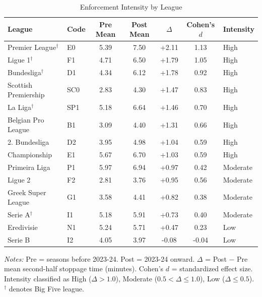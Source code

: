 \begin{table}[t]
\centering
\caption{Enforcement Intensity by League}
\label{tab:enforcement}
\small
\begin{threeparttable}
\begin{tabular}{llccccl}
\toprule
League & Code & Pre Mean & Post Mean & $\Delta$ & Cohen's $d$ & Intensity \\
\midrule
Premier League$^\dagger$ & E0 & 5.39 & 7.50 & +2.11 & 1.13 & High \\
Ligue 1$^\dagger$ & F1 & 4.71 & 6.50 & +1.79 & 1.05 & High \\
Bundesliga$^\dagger$ & D1 & 4.34 & 6.12 & +1.78 & 0.92 & High \\
Scottish Premiership & SC0 & 2.83 & 4.30 & +1.47 & 0.83 & High \\
La Liga$^\dagger$ & SP1 & 5.18 & 6.64 & +1.46 & 0.70 & High \\
Belgian Pro League & B1 & 3.09 & 4.40 & +1.31 & 0.66 & High \\
2. Bundesliga & D2 & 3.95 & 4.98 & +1.04 & 0.59 & High \\
Championship & E1 & 5.67 & 6.70 & +1.03 & 0.59 & High \\
Primeira Liga & P1 & 5.97 & 6.94 & +0.97 & 0.42 & Moderate \\
Ligue 2 & F2 & 2.81 & 3.76 & +0.95 & 0.56 & Moderate \\
Greek Super League & G1 & 3.58 & 4.41 & +0.82 & 0.38 & Moderate \\
Serie A$^\dagger$ & I1 & 5.18 & 5.91 & +0.73 & 0.40 & Moderate \\
Eredivisie & N1 & 5.24 & 5.71 & +0.47 & 0.23 & Low \\
Serie B & I2 & 4.05 & 3.97 & -0.08 & -0.04 & Low \\
\bottomrule
\end{tabular}
\begin{tablenotes}\small
\item \textit{Notes:} Pre = seasons before 2023-24. Post = 2023-24 onward. $\Delta$ = Post $-$ Pre mean second-half stoppage time (minutes). Cohen's $d$ = standardized effect size. Intensity classified as High ($\Delta > 1.0$), Moderate ($0.5 < \Delta \leq 1.0$), Low ($\Delta \leq 0.5$). $^\dagger$ denotes Big Five league.
\end{tablenotes}
\end{threeparttable}
\end{table}

